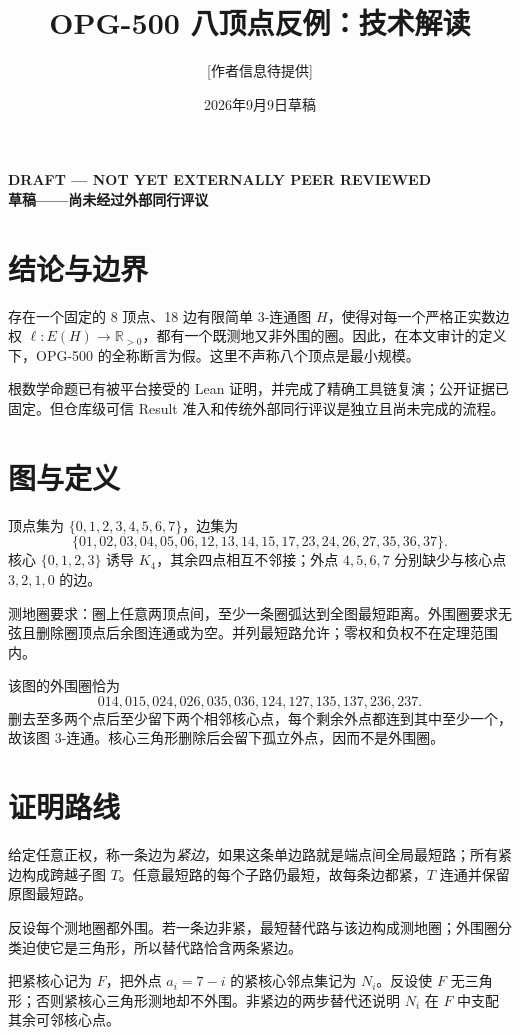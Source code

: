 \documentclass[11pt]{article}
\title{OPG-500 八顶点反例：技术解读}
\author{[作者信息待提供]}
\date{2026年9月9日草稿}
\begin{document}
\maketitle
\begin{center}\textcolor{red!70!black}{\bfseries DRAFT --- NOT YET EXTERNALLY PEER REVIEWED\\草稿——尚未经过外部同行评议}\end{center}

\section{结论与边界}
存在一个固定的 8 顶点、18 边有限简单 3-连通图 $H$，使得对每一个严格正实数边权 $\ell:E(H)\to\mathbb R_{>0}$，都有一个既测地又非外围的圈。因此，在本文审计的定义下，OPG-500 的全称断言为假。这里不声称八个顶点是最小规模。

根数学命题已有被平台接受的 Lean 证明，并完成了精确工具链复演；公开证据已固定。但仓库级可信 Result 准入和传统外部同行评议是独立且尚未完成的流程。

\section{图与定义}
顶点集为 $\{0,1,2,3,4,5,6,7\}$，边集为
\[
\{01,02,03,04,05,06,12,13,14,15,17,23,24,26,27,35,36,37\}.
\]
核心 $\{0,1,2,3\}$ 诱导 $K_4$，其余四点相互不邻接；外点 $4,5,6,7$ 分别缺少与核心点 $3,2,1,0$ 的边。

测地圈要求：圈上任意两顶点间，至少一条圈弧达到全图最短距离。外围圈要求无弦且删除圈顶点后余图连通或为空。并列最短路允许；零权和负权不在定理范围内。

该图的外围圈恰为
\[
014,015,024,026,035,036,124,127,135,137,236,237.
\]
删去至多两个点后至少留下两个相邻核心点，每个剩余外点都连到其中至少一个，故该图 3-连通。核心三角形删除后会留下孤立外点，因而不是外围圈。

\section{证明路线}
给定任意正权，称一条边为\emph{紧边}，如果这条单边路就是端点间全局最短路；所有紧边构成跨越子图 $T$。任意最短路的每个子路仍最短，故每条边都紧，$T$ 连通并保留原图最短路。

反设每个测地圈都外围。若一条边非紧，最短替代路与该边构成测地圈；外围圈分类迫使它是三角形，所以替代路恰含两条紧边。

把紧核心记为 $F$，把外点 $a_i=7-i$ 的紧核心邻点集记为 $N_i$。反设使 $F$ 无三角形；否则紧核心三角形测地却不外围。非紧边的两步替代还说明 $N_i$ 在 $F$ 中支配其余可邻核心点。
\end{document}
